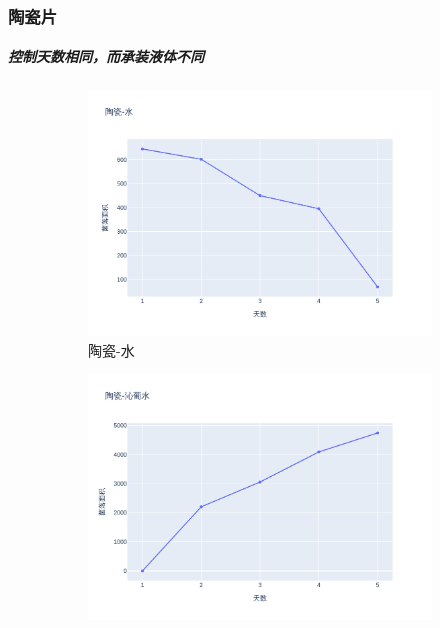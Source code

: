 \documentclass[12pt,a4paper]{ctexart}
\begin{document}
\subsubsection{陶瓷片}
\subparagraph{控制天数相同，而承装液体不同}
\begin{figure}[htbp]  %
    \centering  %
    \begin{subfigure}[b]{0.31\textwidth}  %
        \centering
        \includegraphics[width=\linewidth]{./plot/SingleMaterial/china/陶瓷-水_line.png}  %
        \caption{陶瓷-水}  %
        \label{subfig:1}     %
    \end{subfigure}
    \hfill  %
    \begin{subfigure}[b]{0.31\textwidth}
        \centering
        \includegraphics[width=\linewidth]{./plot/SingleMaterial/china/陶瓷-沁葡水_line.png}

\end{subfigure}
\end{figure}
\end{document}

